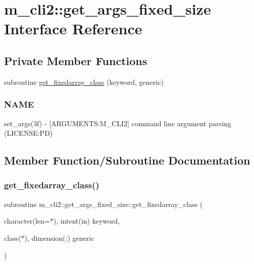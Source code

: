 \hypertarget{interfacem__cli2_1_1get__args__fixed__size}{}\section{m\+\_\+cli2\+:\+:get\+\_\+args\+\_\+fixed\+\_\+size Interface Reference}
\label{interfacem__cli2_1_1get__args__fixed__size}
\subsection*{Private Member Functions}
\begin{DoxyCompactItemize}
\item 
subroutine \mbox{\hyperlink{interfacem__cli2_1_1get__args__fixed__size_af6328f5272a7af47ab3262035de6725d}{get\+\_\+fixedarray\+\_\+class}} (keyword, generic)
\begin{DoxyCompactList}\small\item\em \subsubsection*{N\+A\+ME}

set\+\_\+args(3f) -\/ \mbox{[}A\+R\+G\+U\+M\+E\+N\+TS\+:M\+\_\+\+C\+L\+I2\mbox{]} command line argument parsing (L\+I\+C\+E\+N\+SE\+:PD) \end{DoxyCompactList}\end{DoxyCompactItemize}


\subsection{Member Function/\+Subroutine Documentation}
\mbox{\label{interfacem__cli2_1_1get__args__fixed__size_af6328f5272a7af47ab3262035de6725d}} 
\subsubsection{\texorpdfstring{get\+\_\+fixedarray\+\_\+class()}{get\_fixedarray\_class()}}
{\footnotesize\ttfamily subroutine m\+\_\+cli2\+::get\+\_\+args\+\_\+fixed\+\_\+size\+::get\+\_\+fixedarray\+\_\+class (\begin{DoxyParamCaption}\item[{character(len=$\ast$), intent(in)}]{keyword,  }\item[{class($\ast$), dimension(\+:)}]{generic }\end{DoxyParamCaption})\hspace{0.3cm}{\ttfamily [private]}}



